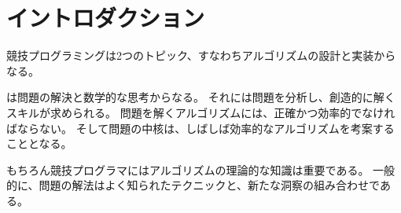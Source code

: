 \begin{comment}
\chapter{Introduction}
\end{comment}
\chapter{イントロダクション}

\begin{comment}
Competitive programming combines two topics:
(1) the design of algorithms and (2) the implementation of algorithms.
\end{comment}

競技プログラミングは2つのトピック、すなわちアルゴリズムの設計と実装からなる。

\begin{comment}
The \key{design of algorithms} consists of problem solving
and mathematical thinking.
Skills for analyzing problems and solving them
creatively are needed.
An algorithm for solving a problem
has to be both correct and efficient,
and the core of the problem is often
about inventing an efficient algorithm.
\end{comment}

は問題の解決と数学的な思考からなる。
それには問題を分析し、創造的に解くスキルが求められる。
問題を解くアルゴリズムには、正確かつ効率的でなければならない。
そして問題の中核は、しばしば効率的なアルゴリズムを考案することとなる。


\begin{comment}
Theoretical knowledge of algorithms
is important to competitive programmers.
Typically, a solution to a problem is
a combination of well-known techniques and
new insights.
The techniques that appear in competitive programming
also form the basis for the scientific research
of algorithms.
\end{comment}

もちろん競技プログラマにはアルゴリズムの理論的な知識は重要である。
一般的に、問題の解法はよく知られたテクニックと、新たな洞察の組み合わせである。

\begin{comment}
The \key{implementation of algorithms} requires good
programming skills.
In competitive programming, the solutions
are graded by testing an implemented algorithm
using a set of test cases.
Thus, it is not enough that the idea of the
algorithm is correct, but the implementation also
has to be correct.
\end{comment}

